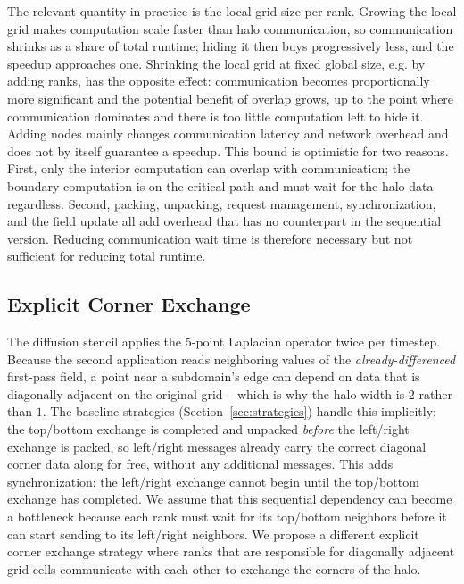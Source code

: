 \documentclass{article}
\begin{document}
The relevant quantity in practice is the local grid size per rank. Growing the local grid makes computation scale faster than halo communication, so communication shrinks as a share of total runtime; hiding it then buys progressively less, and the speedup approaches one. Shrinking the local grid at fixed global size, e.g. by adding ranks, has the opposite effect: communication becomes proportionally more significant and the potential benefit of overlap grows, up to the point where communication dominates and there is too little computation left to hide it. Adding nodes mainly changes communication latency and network overhead and does not by itself guarantee a speedup. This bound is optimistic for two reasons. First, only the interior computation can overlap with communication; the boundary computation is on the critical path and must wait for the halo data regardless. Second, packing, unpacking, request management, synchronization, and the field update all add overhead that has no counterpart in the sequential version. Reducing communication wait time is therefore necessary but not sufficient for reducing total runtime.


\subsection{Explicit Corner Exchange}
\label{sec:corners}

The diffusion stencil applies the 5-point Laplacian operator twice per
timestep. Because the second application reads neighboring
values of the \emph{already-differenced} first-pass field, a point near
a subdomain's edge can depend on data that is diagonally adjacent on
the original grid -- which is why the halo width is $2$ rather than
$1$. The baseline strategies (Section~\ref{sec:strategies}) handle this
implicitly: the top/bottom exchange is completed and unpacked
\emph{before} the left/right exchange is packed, so left/right messages
already carry the correct diagonal corner data along for free, without
any additional messages. This adds synchronization: the left/right
exchange cannot begin until the top/bottom exchange has completed. We
assume that this sequential dependency can become a bottleneck because
each rank must wait for its top/bottom neighbors before it can start
sending to its left/right neighbors. We propose a different explicit corner exchange strategy where ranks that are responsible for diagonally adjacent grid cells communicate with each other to exchange the corners of the halo.
\end{document}
